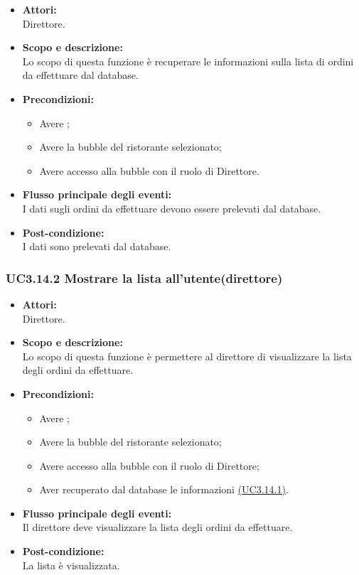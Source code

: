 \begin{itemize}
	\item \textbf{Attori:}
	\\Direttore.
	\item \textbf{Scopo e descrizione:} 
	\\Lo scopo di questa funzione è recuperare le informazioni sulla lista di ordini da effettuare dal database.
	\item \textbf{Precondizioni:}
	\begin{itemize}
		\item Avere ;
		\item Avere la bubble del ristorante selezionato;
		\item Avere accesso alla bubble con il ruolo di Direttore.
	\end{itemize}
	\item \textbf{Flusso principale degli eventi:}
	\\I dati sugli ordini da effettuare devono essere prelevati dal database.
	\item \textbf{Post-condizione:}
	\\I dati sono prelevati dal database.
\end{itemize}

\subsubsection{UC3.14.2 Mostrare la lista all’utente(direttore)} \label{UC3.14.2}

\begin{itemize}
	\item \textbf{Attori:}
	\\Direttore.
	\item \textbf{Scopo e descrizione:} 
	\\Lo scopo di questa funzione è permettere al direttore di visualizzare la lista degli ordini da effettuare.
	\item \textbf{Precondizioni:}
	\begin{itemize}
		\item Avere ;
		\item Avere la bubble del ristorante selezionato;
		\item Avere accesso alla bubble con il ruolo di Direttore;
		\item Aver recuperato dal database le informazioni \hyperref[UC3.14.1]{(UC3.14.1)}.
	\end{itemize}
	\item \textbf{Flusso principale degli eventi:}
	\\Il direttore deve visualizzare la lista degli ordini da effettuare.
	\item \textbf{Post-condizione:}
	\\La lista è visualizzata.
\end{itemize}

